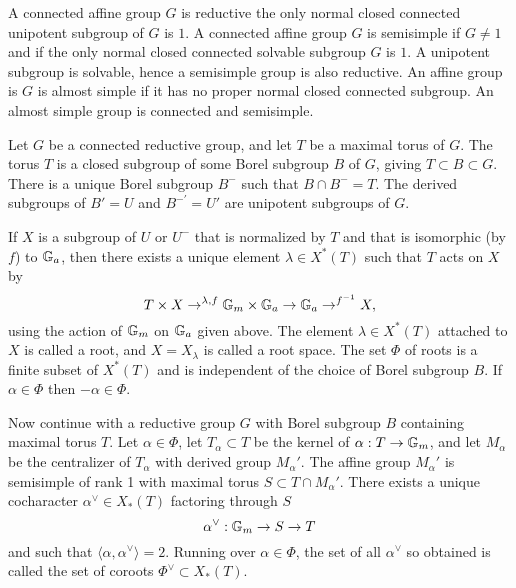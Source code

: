 A connected affine group $G$ is reductive the only normal closed
connected unipotent subgroup of $G$ is $1$.  A connected affine group
$G$ is semisimple if $G\ne 1$ and if the only normal closed connected
solvable subgroup $G$ is $1$.  A unipotent subgroup is solvable, hence
a semisimple group is also reductive.  An affine group is $G$ is
almost simple if it has no proper normal closed connected subgroup.
An almost simple group is connected and semisimple.

Let $G$ be a connected reductive group, and let $T$ be a maximal torus
of $G$.  The torus $T$ is a closed subgroup of some Borel subgroup $B$
of $G$, giving $T\subset B\subset G$.  There is a unique Borel
subgroup $B^-$ such that $B\cap B^- = T$.  The derived subgroups of
$B' = U$ and $B^{-'} = U'$ are unipotent subgroups of $G$.

If $X$ is a subgroup of $U$ or $U^-$ that is normalized by $T$ and
that is isomorphic (by $f$) to ${\Bbb G}_a$, then there exists a
unique element $\lambda\in X^*(T)$ such that $T$ acts on $X$ by
\[
T\times X\to^{\lambda,f} {\Bbb G}_m \times {\Bbb G}_a
\to {\Bbb G}_a \to^{f^{-1}} X,
\]
using the action of ${\Bbb G}_m$ on ${\Bbb G}_a$ given above.  The
element $\lambda\in X^*(T)$ attached to $X$ is called a root, and $X =
X_\lambda$ is called a root space.  The set $\Phi$ of roots is a
finite subset of $X^*(T)$ and is independent of the choice of Borel
subgroup $B$.  If $\alpha\in \Phi$ then $-\alpha\in \Phi$.



Now continue with a reductive group $G$ with Borel subgroup $B$
containing maximal torus $T$.  Let $\alpha\in\Phi$, let
$T_\alpha\subset T$ be the kernel of $\alpha: T\to {\Bbb G}_m$, and
let $M_\alpha$ be the centralizer of $T_\alpha$ with derived group
$M_\alpha'$.  The affine group $M_\alpha'$ is semisimple of rank 1
with maximal torus $S \subset T \cap M_\alpha'$.  There exists a
unique cocharacter $\alpha^\vee\in X_*(T)$ factoring through $S$
\[
\alpha^\vee:{\Bbb G}_m\to S \to T
\]
and such that $\langle \alpha,\alpha^\vee\rangle = 2$.  Running over
$\alpha\in \Phi$, the set of all $\alpha^\vee$ so obtained is called the
set of coroots $\Phi^\vee\subset X_*(T)$.

